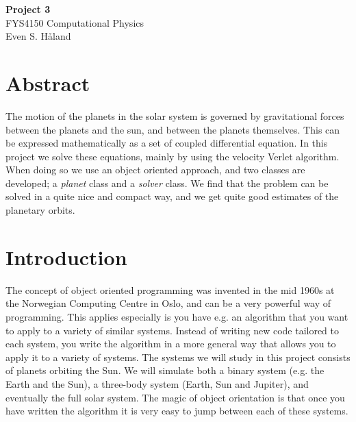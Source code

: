 \documentclass[12pt, a4paper]{article}
\begin{document}
\begin{titlepage}
\begin{center}
\vspace*{3cm}
\Huge
\textbf{Project 3} \\
\Large  
FYS4150 Computational Physics 
\vspace*{3cm} \\ 

Even S. Håland 
\vspace*{5cm} \\

\normalsize
\section*{Abstract}

The motion of the planets in the solar system is governed by gravitational forces between the planets 
and the sun, and between the planets themselves. This can be expressed mathematically as a set of coupled 
differential equation. In this project we solve these equations, mainly by using the velocity Verlet 
algorithm. When doing so we use an object oriented approach, and two classes are developed; a 
\textit{planet} class and a \textit{solver} class. We find that the problem can be solved in a quite nice 
and compact way, and we get quite good estimates of the planetary orbits.  

\end{center}
\end{titlepage}

\section{Introduction}

The concept of object oriented programming was invented in the mid 1960s at the Norwegian Computing 
Centre in Oslo, and can be a very powerful way of programming. This applies especially is 
you have e.g. an algorithm that you want to apply to a variety of similar systems. Instead of writing 
new code tailored to each system, you write the algorithm in a more general way that allows you to 
apply it to a variety of systems. The systems we will study in this project consists of planets 
orbiting the Sun. We will simulate both a binary system (e.g. the Earth and the Sun), a three-body system 
(Earth, Sun and Jupiter), and eventually the full solar system. The magic of object orientation is that 
once you have written the algorithm it is very easy to jump between each of these systems. 
\end{document}
